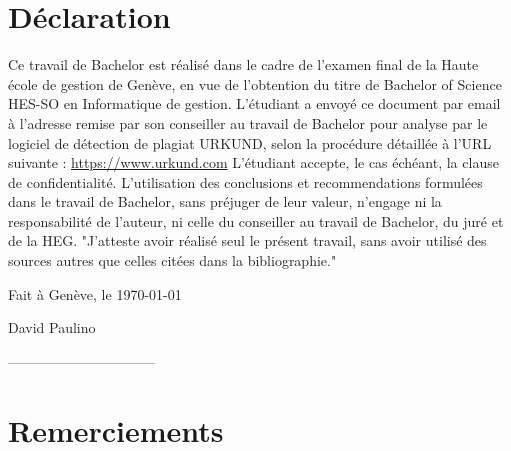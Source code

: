 \documentclass[12pt]{article}
\newcommand{\DP}{David Paulino}
\newcommand{\place}{Genève}
\begin{document}
\newpage

\section{Déclaration}
Ce travail de Bachelor est réalisé dans le cadre de l'examen final de la Haute école de gestion de Genève, en vue de l'obtention du titre de Bachelor of Science HES-SO en Informatique de gestion.
\newline\newline
L'étudiant a envoyé ce document par email à l'adresse remise par son conseiller au travail de Bachelor pour analyse par le logiciel de détection de plagiat URKUND, selon la procédure détaillée à l'URL suivante : \url{https://www.urkund.com}
\newline\newline
L'étudiant accepte, le cas échéant, la clause de confidentialité. 
L'utilisation des conclusions et recommendations formulées dans le travail de Bachelor, sans préjuger de leur valeur, n'engage ni la responsabilité de l'auteur, ni celle du conseiller au travail de Bachelor, du juré et de la HEG.
\newline\newline
"J'atteste avoir réalisé seul le présent travail, sans avoir utilisé des sources autres que celles citées dans la bibliographie."
\vspace{4cm}
\begin{flushright}
    Fait à \place, le \today
\end{flushright}

\begin{flushright}
    \DP
\end{flushright}
\vspace{1cm}
\begin{flushright}
    --------------------------------
\end{flushright}


\newpage

\section{Remerciements}
\end{document}
